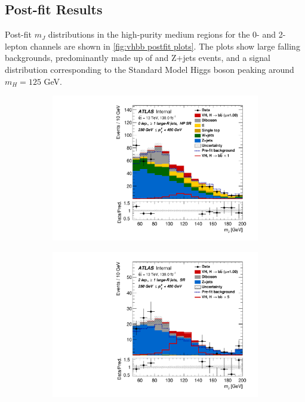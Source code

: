 \subsection{Post-fit Results}

Post-fit $m_J$ distributions in the high-purity medium \pTV regions for the 0- and 2-lepton channels are shown in \cref{fig:vhbb postfit plots}. The plots show large falling backgrounds, predominantly made up of \Wjets and Z+jets events, and a signal distribution corresponding to the Standard Model Higgs boson peaking around $m_H = 125$ GeV.

\begin{figure}[!htbp]
  \centering
  \begin{subfigure}{.4\textwidth}
    \centering
    \includegraphics[width=\textwidth]{chapters/6.vhbb_boosted/figs/Region_BMax400_BMin250_incFat1_Fat1_Y6051_DSRnoaddbjetsr_T2_L0_distmBB_J0_GlobalFit_conditionnal_mu1.pdf}
  \end{subfigure}%
  \begin{subfigure}{.4\textwidth}
    \centering
    \includegraphics[width=\textwidth]{chapters/6.vhbb_boosted/figs/Region_distmBB_J0_L2_T2_DSR_Y6051_incJet1_Fat1_incFat1_BMin250_BMax400_GlobalFit_conditionnal_mu1.pdf}

\end{subfigure}
\end{figure}

